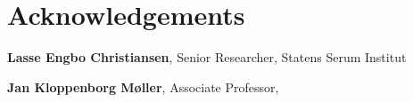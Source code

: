 \section*{Acknowledgements}

\textbf{Lasse Engbo Christiansen}, Senior Researcher, Statens Serum Institut \newline
\blindtext

\textbf{Jan Kloppenborg Møller}, Associate Professor, \universitydescriber \newline
\blindtext

